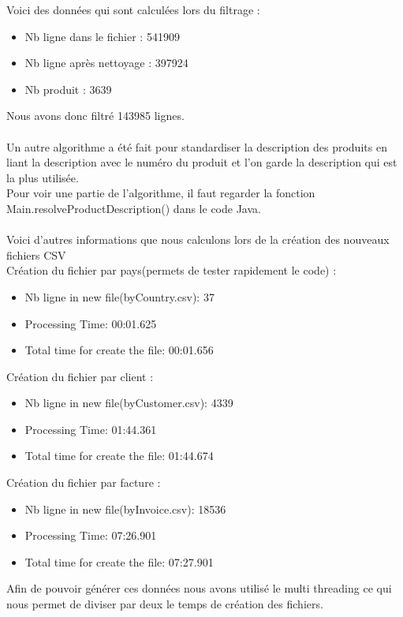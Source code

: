 \documentclass[a4paper]{article}
\begin{document}
Voici des données qui sont calculées lors du filtrage :
\begin{itemize}  
\item Nb ligne dans le fichier : 541909
\item Nb ligne après nettoyage : 397924
\item Nb produit : 3639
\end{itemize}
\vspace{6pt}
Nous avons donc filtré 143985 lignes.
\\\\
Un autre algorithme a été fait pour standardiser la description des produits en liant la description avec le numéro du produit et l’on garde la description qui est la plus utilisée.
\\ 
Pour voir une partie de l’algorithme, il faut regarder la fonction Main.resolveProductDescription() dans le code Java.
\\\\
Voici d’autres informations que nous calculons lors de la création des nouveaux fichiers CSV
\\
Création du fichier par pays(permets de tester rapidement le code) :
\begin{itemize}  
\item Nb ligne in new file(byCountry.csv): 37
\item Processing Time: 00:01.625
\item Total time for create the file: 00:01.656
\end{itemize}
\vspace{6pt}
Création du fichier par client :
\begin{itemize}  
\item Nb ligne in new file(byCustomer.csv): 4339
\item Processing Time: 01:44.361
\item Total time for create the file: 01:44.674 
\end{itemize}
\vspace{6pt}
Création du fichier par facture :
\begin{itemize}  
\item Nb ligne in new file(byInvoice.csv): 18536
\item Processing Time: 07:26.901
\item Total time for create the file: 07:27.901
\end{itemize}
\vspace{6pt}
Afin de pouvoir générer ces données nous avons utilisé le multi threading ce qui nous permet de diviser par deux le temps de création des fichiers.
\end{document}
